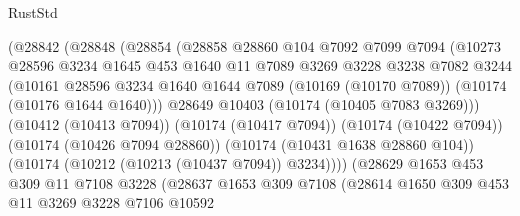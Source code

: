 \begin{lexlean}{RustStd}
\begin{coremodule}
                          (@28842
                            (@28848
                              (@28854
                                (@28858
                                  @28860
                                  @104
                                  @7092
                                  @7099
                                  @7094
                                  (@10273
                                    @28596
                                    @3234
                                    @1645
                                    @453
                                    @1640
                                    @11
                                    @7089
                                    @3269
                                    @3228
                                    @3238
                                    @7082
                                    @3244
                                    (@10161
                                      @28596
                                      @3234
                                      @1640
                                      @1644
                                      @7089
                                      (@10169 (@10170 @7089))
                                      (@10174 (@10176 @1644 @1640)))
                                    @28649
                                    @10403
                                    (@10174 (@10405 @7083 @3269)))
                                  (@10412 (@10413 @7094))
                                  (@10174 (@10417 @7094))
                                  (@10174 (@10422 @7094))
                                  (@10174 (@10426 @7094 @28860))
                                  (@10174 (@10431 @1638 @28860 @104))
                                  (@10174 (@10212 (@10213 (@10437 @7094)) @3234))))
                              (@28629
                                @1653
                                @453
                                @309
                                @11
                                @7108
                                @3228
                                (@28637
                                  @1653
                                  @309
                                  @7108
                                  (@28614
                                    @1650
                                    @309
                                    @453
                                    @11
                                    @3269
                                    @3228
                                    @7106
                                    @10592

\end{coremodule}
\end{lexlean}

